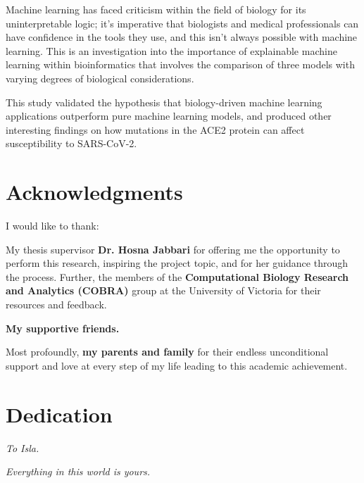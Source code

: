 \vspace{1em}\noindent
Machine learning has faced criticism within the field of biology for its uninterpretable logic; it's imperative that biologists and medical professionals can have confidence in the tools they use, and this isn't always possible with machine learning. This is an investigation into the importance of explainable machine learning within bioinformatics that involves the comparison of three models with varying degrees of biological considerations.

\vspace{1em}\noindent
This study validated the hypothesis that biology-driven machine learning applications outperform pure machine learning models, and produced other interesting findings on how mutations in the ACE2 protein can affect susceptibility to SARS-CoV-2.


\newpage
\tableofcontents
{}

\newpage
\listofcombined
{}

\newpage
\section*{Acknowledgments}

I would like to thank:

My thesis supervisor \textbf{Dr. Hosna Jabbari} for offering me the opportunity to perform this research, inspiring the project topic, and for her guidance through the process. Further, the members of the \textbf{Computational Biology Research and Analytics (COBRA)} group at the University of Victoria for their resources and feedback.

\textbf{My supportive friends.}

Most profoundly, \textbf{my parents and family} for their endless unconditional support and love at every step of my life leading to this academic achievement.





\newpage
\section*{Dedication}
\emph{To Isla.}

\vspace{1em}

\noindent\emph{Everything in this world is yours.}

\newpage
\
\newpage